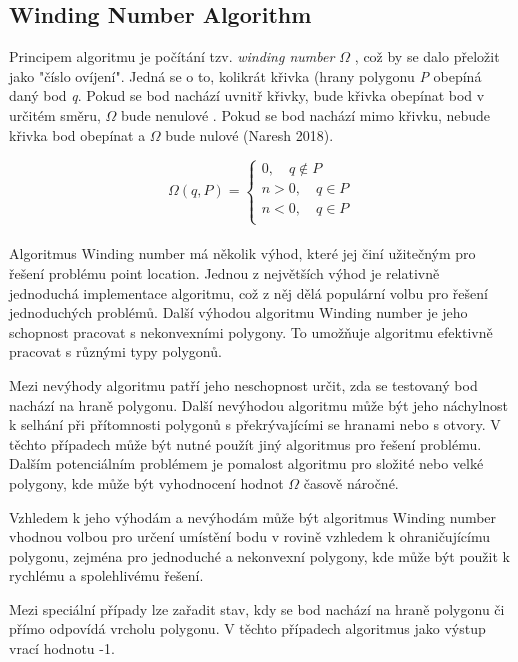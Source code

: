 \documentclass[a4paper,12pt]{article}
\begin{document}
    \subsection{Winding Number Algorithm}
    Principem algoritmu je počítání tzv. \emph{winding number $\varOmega$} , což by se dalo přeložit jako "číslo ovíjení". Jedná se o to, kolikrát křivka (hrany polygonu \emph{P}  obepíná daný bod \emph{q}. Pokud se bod nachází uvnitř křivky, bude křivka obepínat bod v určitém směru, $\varOmega$ bude nenulové . Pokud se bod nachází mimo křivku, nebude křivka bod obepínat a $\varOmega$ bude nulové (Naresh 2018).



    \begin{equation*}
    \varOmega (q, P)=
    \begin{cases}
    0, \quad q \notin P\\
    n > 0, \quad q \in P\\
    n < 0, \quad q \in P\\
    \end{cases}
    \end{equation*}\\

    Algoritmus Winding number má několik výhod, které jej činí užitečným pro řešení problému point location. Jednou z největších výhod je relativně jednoduchá implementace algoritmu, což z něj dělá populární volbu pro řešení jednoduchých problémů. Další výhodou algoritmu Winding number je jeho schopnost pracovat s nekonvexními polygony. To umožňuje algoritmu efektivně pracovat s různými typy polygonů. 

    Mezi nevýhody algoritmu patří jeho neschopnost určit, zda se testovaný bod nachází na hraně polygonu. Další nevýhodou algoritmu může být jeho náchylnost k selhání při přítomnosti polygonů s překrývajícími se hranami nebo s otvory. V těchto případech může být nutné použít jiný algoritmus pro řešení problému. Dalším potenciálním problémem je pomalost algoritmu pro složité nebo velké polygony, kde může být vyhodnocení hodnot \emph{$\varOmega$} časově náročné.

    Vzhledem k jeho výhodám a nevýhodám může být algoritmus Winding number vhodnou volbou pro určení umístění bodu v rovině vzhledem k ohraničujícímu polygonu, zejména pro jednoduché a nekonvexní polygony, kde může být použit k rychlému a spolehlivému řešení.

    Mezi speciální případy lze zařadit stav, kdy se bod nachází na hraně polygonu či přímo odpovídá vrcholu polygonu. V těchto případech algoritmus jako výstup vrací hodnotu -1.
\end{document}
